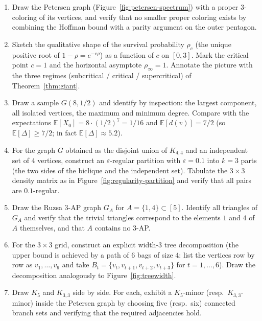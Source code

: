 \documentclass{article}
\theoremstyle{definition}
\begin{document}
\begin{enumerate}[resume]
\item Draw the Petersen graph (Figure~\ref{fig:petersen-spectrum}) with a
proper $3$-coloring of its vertices, and verify that no smaller
proper coloring exists by combining the Hoffman bound with a parity
argument on the outer pentagon.

\item Sketch the qualitative shape of the survival probability $\rho_c$
(the unique positive root of $1 - \rho = e^{-c\rho}$) as a function
of $c$ on $[0, 3]$. Mark the critical point $c = 1$ and the
horizontal asymptote $\rho_\infty = 1$. Annotate the picture with
the three regimes (subcritical / critical / supercritical) of
Theorem~\ref{thm:giant}.

\item Draw a sample $G(8, 1/2)$ and identify by inspection: the largest
component, all isolated vertices, the maximum and minimum degree.
Compare with the expectations $\mathbb{E}[X_0] = 8 \cdot (1/2)^7 = 1/16$
and $\mathbb{E}[d(v)] = 7/2$ (so $\mathbb{E}[\Delta] \ge 7/2$; in fact
$\mathbb{E}[\Delta] \approx 5.2$).

\item For the graph $G$ obtained as the disjoint union of $K_{4,4}$ and an
independent set of $4$ vertices, construct an $\varepsilon$-regular
partition with $\varepsilon = 0.1$ into $k = 3$ parts (the two sides of
the biclique and the independent set). Tabulate the $3 \times 3$
density matrix as in Figure~\ref{fig:regularity-partition} and verify
that all pairs are $0.1$-regular.

\item Draw the Ruzsa $3$-AP graph $G_A$ for $A = \{1, 4\} \subset [5]$.
Identify all triangles of $G_A$ and verify that the trivial triangles
correspond to the elements $1$ and $4$ of $A$ themselves, and that
$A$ contains no $3$-AP.

\item For the $3 \times 3$ grid, construct an explicit width-$3$ tree
decomposition (the upper bound is achieved by a path of $6$ bags of
size $4$: list the vertices row by row as $v_1, \dots, v_9$ and take
$B_t = \{v_t, v_{t+1}, v_{t+2}, v_{t+3}\}$ for $t = 1, \dots, 6$). Draw the
decomposition analogously to Figure~\ref{fig:treewidth}.

\item Draw $K_5$ and $K_{3,3}$ side by side. For each, exhibit a
$K_5$-minor (resp.\ $K_{3,3}$-minor) inside the Petersen graph by
choosing five (resp.\ six) connected branch sets and verifying that
the required adjacencies hold.
\end{enumerate}




\end{document}
